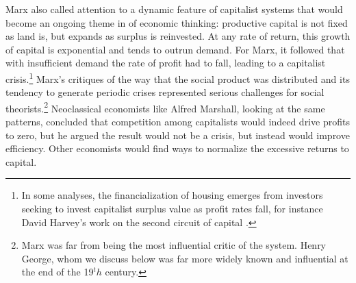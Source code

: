 
Marx also called attention to a dynamic feature of capitalist systems that would become an ongoing theme in of economic thinking: productive capital is not fixed as land is, but expands as surplus is reinvested. At any rate of return, this growth of capital is exponential and tends to outrun demand. %
For Marx, it followed that with insufficient demand the rate of profit had to fall, leading to a capitalist crisis.\footnote{In some analyses, the financialization of housing emerges from investors seeking to invest capitalist surplus value as profit rates fall, for instance David Harvey's work on \gls{the second circuit of capital} \cite{harveyClassmonopolyRentFinance1974}.} Marx's critiques of the way that the social product was distributed and its tendency to generate periodic crises represented serious challenges for social theorists.\footnote{Marx was far from being the most influential critic of the system. Henry George, whom we discuss below was far more widely known and influential at the end of the 19$^th$ century.} 
Neoclassical economists like Alfred Marshall, looking at the same patterns, concluded that competition among capitalists would indeed drive profits to zero, but he argued the result would not be a crisis, but instead would improve efficiency. 
Other economists would find ways to normalize the excessive returns to capital. 


